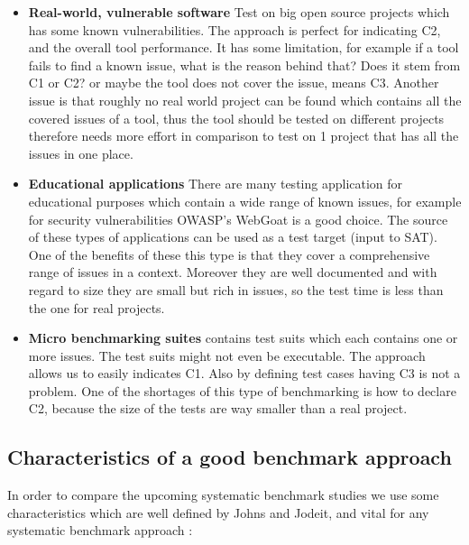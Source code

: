 \documentclass[authoryear,preprint]{sigplanconf}
\begin{document}
\begin{itemize}
	\item \textbf{Real-world, vulnerable software} Test on big open source projects which has some known vulnerabilities. The approach is perfect for indicating C2, and the overall tool performance. It has some limitation, for example if a tool fails to find a known issue, what is the reason behind that? Does it stem from C1 or C2? or maybe the tool does not cover the issue, means C3. Another issue is that roughly no real world project can be found which contains all the covered issues of a tool, thus the tool should be tested on different projects therefore needs more effort in comparison to test on 1 project that has all the issues in one place.
	
	\item \textbf{Educational applications} There are many testing application for educational purposes which contain a wide range of known issues, for example for security vulnerabilities OWASP’s WebGoat \cite{owasp} is a good choice. The source of these types of applications can be used as a test target (input to SAT). One of the benefits of these this type is that they cover a comprehensive range of issues in a context. Moreover they are well documented and with regard to size they are small but rich in issues, so the test time is less than the one for real projects. 
	
	\item \textbf{Micro benchmarking suites} contains test suits which each contains one or more issues. The test suits might not even be executable. The approach allows us to easily indicates C1. Also by defining test cases having C3 is not a problem. One of the shortages of this type of benchmarking is how to declare C2, because the size of the tests are way smaller than a real project. 
\end{itemize}

\subsection{Characteristics of a good benchmark approach}
\label{sec:good_benchmark}

In order to compare the upcoming systematic benchmark studies we use some characteristics which are well defined by Johns and Jodeit, and vital for any systematic benchmark approach \cite{Scanstud}:
\end{document}
